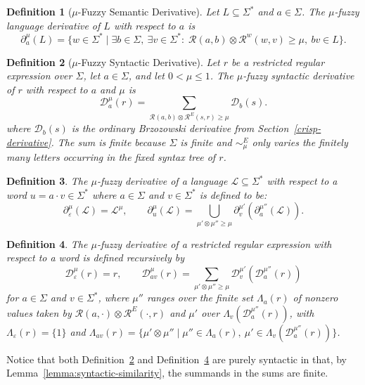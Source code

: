 \documentclass{article}
\newcommand{\cR}{{\mathcal R}}
\def\cut{\mu}
\newtheorem{definition}{Definition}[section]
\begin{document}
\begin{definition}[$\mu$-Fuzzy Semantic Derivative]\label{fuzzyderivative}
Let ${L}\subseteq\Sigma^*$ and $a\in\Sigma$. The \emph{$\cut$-fuzzy
language derivative} of ${L}$ with respect to $a$ is
$$
\partial_a^\cut({L})
=
\{w \in \Sigma^* \mid
  \exists b \in \Sigma,\ \exists v\in\Sigma^*
  :\;
  \cR(a,b)\otimes \mathcal{R}^w(w,v)\ge\cut,\ bv \in {L}
\}.
$$
\end{definition}

\begin{definition}[$\mu$-Fuzzy Syntactic Derivative]\label{def:regex-fuzzy-derivative}
Let $r$ be a restricted regular expression over $\Sigma$, let $a\in\Sigma$, and let
$0<\cut\le 1$. The \emph{$\mu$-fuzzy syntactic derivative} of $r$ with respect to $a$ and
$\cut$ is
\[
  \mathcal D_a^\cut(r)
  =
  \sum_{\mathcal R(a, b)\otimes \mathcal R^{E}( s, r)\geq \mu}
  \mathcal D_b(s).
\]
where $\mathcal D_b(s)$ is the ordinary Brzozowski derivative from
Section~\ref{crisp-derivative}. The sum is finite because $\Sigma$ is finite
and $\sim_\cut^E$ only varies the finitely many letters occurring in the fixed
syntax tree of $r$.
\end{definition}

\begin{definition}\label{def:fuzzy-word-derivative}
    The $\mu$-fuzzy derivative of a language $\mathcal{L} \subseteq \Sigma^*$ with respect to a word $u=a\cdot v \in \Sigma^*$ where $a \in \Sigma$ and $v \in \Sigma^*$ is defined to be:
    $$
    \partial^\cut_\varepsilon(\mathcal{L}) = \mathcal{L}^\cut,
    \qquad
    \partial^\cut_u(\mathcal{L}) = \bigcup_{\cut'\otimes \cut''\geq \cut}\partial^{\cut'}_v(\partial^{\cut''}_a(\mathcal{L})).
    $$
\end{definition}


\begin{definition}\label{def:regex-fuzzy-word-derivative}
The $\mu$-fuzzy derivative of a restricted regular expression with respect to a word is defined
recursively by
\[
  \mathcal D_\varepsilon^\cut(r)=r,
  \qquad
  \mathcal D_{av}^\cut(r)=\sum_{\mu'\otimes\mu''\geq \mu}\mathcal D_v^{\cut'}(\mathcal D_a^{\cut''}(r))
\]
for $a\in\Sigma$ and $v\in\Sigma^*${\color{blue}, where $\cut''$ ranges over the finite set $\Lambda_a(r)$ of nonzero values taken by $\cR(a,\cdot)\otimes\cR^E(\cdot,r)$ and $\cut'$ over $\Lambda_v(\mathcal D_a^{\cut''}(r))$, with $\Lambda_\varepsilon(r)=\{1\}$ and $\Lambda_{av}(r)=\{\cut'\otimes\cut''\mid \cut''\in\Lambda_a(r),\ \cut'\in\Lambda_v(\mathcal D_a^{\cut''}(r))\}$}.
\end{definition}
Notice that both Definition~\ref{def:regex-fuzzy-derivative} and Definition~\ref{def:regex-fuzzy-word-derivative} are purely syntactic in that, by Lemma~\ref{lemma:syntactic-similarity}, the summands in the sums are finite. 
 
\end{document}

